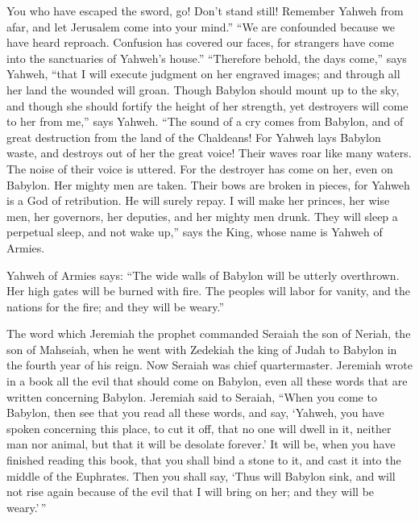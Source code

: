  You who have escaped the sword, go! Don't stand still!
Remember Yahweh from afar, and let Jerusalem come into your mind.''
 ``We are confounded because we have heard reproach.
Confusion has covered our faces, for strangers have come into the
sanctuaries of Yahweh's house.''  ``Therefore behold, the
days come,'' says Yahweh, ``that I will execute judgment on her engraved
images; and through all her land the wounded will groan. 
Though Babylon should mount up to the sky, and though she should fortify
the height of her strength, yet destroyers will come to her from me,''
says Yahweh.  ``The sound of a cry comes from Babylon, and
of great destruction from the land of the Chaldeans!  For
Yahweh lays Babylon waste, and destroys out of her the great voice!
Their waves roar like many waters. The noise of their voice is uttered.
 For the destroyer has come on her, even on Babylon. Her
mighty men are taken. Their bows are broken in pieces, for Yahweh is a
God of retribution. He will surely repay.  I will make her
princes, her wise men, her governors, her deputies, and her mighty men
drunk. They will sleep a perpetual sleep, and not wake up,'' says the
King, whose name is Yahweh of Armies.

 Yahweh of Armies says: ``The wide walls of Babylon will be
utterly overthrown. Her high gates will be burned with fire. The peoples
will labor for vanity, and the nations for the fire; and they will be
weary.''

 The word which Jeremiah the prophet commanded Seraiah the
son of Neriah, the son of Mahseiah, when he went with Zedekiah the king
of Judah to Babylon in the fourth year of his reign. Now Seraiah was
chief quartermaster.  Jeremiah wrote in a book all the evil
that should come on Babylon, even all these words that are written
concerning Babylon.  Jeremiah said to Seraiah, ``When you
come to Babylon, then see that you read all these words, 
and say, `Yahweh, you have spoken concerning this place, to cut it off,
that no one will dwell in it, neither man nor animal, but that it will
be desolate forever.'  It will be, when you have finished
reading this book, that you shall bind a stone to it, and cast it into
the middle of the Euphrates.  Then you shall say, `Thus
will Babylon sink, and will not rise again because of the evil that I
will bring on her; and they will be weary.'\,''

